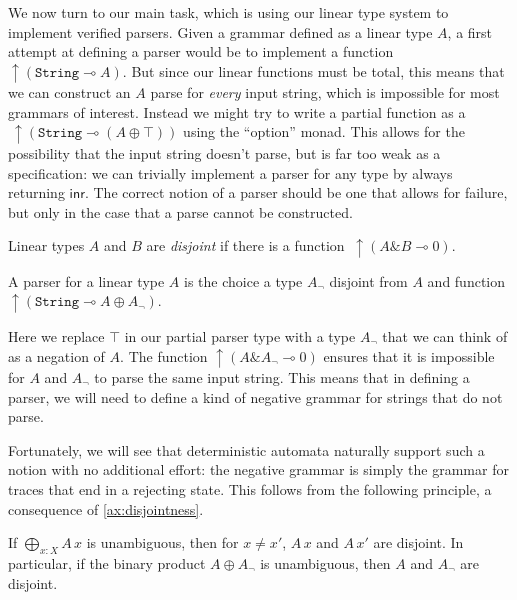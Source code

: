 \documentclass[acmsmall,nonacm]{acmart}
\newcommand{\inr}{\mathsf{inr}}
\newcommand{\lto}{\multimap}
\newcommand{\StringGram}{\texttt{String}}
\newcommand{\ltonl}[1]{~\uparrow #1}
\newcommand{\LinSigTy}[3]{\textstyle\bigoplus_{#1 : #2} #3}
\newcommand{\agdalogo}{%
  \usebox{\logoagdabox}}%
\newcommand{\zenodolink}{https://zenodo.org/records/15049780}
\newcommand{\Agda}{\href{\zenodolink}{\agdalogo}}
\begin{document}
We now turn to our main task, which is using our linear type system to
implement verified parsers. Given a grammar defined as a linear type
$A$, a first attempt at defining a parser would be to implement a
function $\uparrow{(\StringGram \lto A)}$. But since our linear functions
must be total, this means that we can construct an $A$ parse for
\emph{every} input string, which is impossible for most grammars of
interest. Instead we might try to write a partial function as a
$\ltonl{(\StringGram \lto (A \oplus \top))}$ using the ``option''
monad. This allows for the possibility that the input string doesn't
parse, but is far too weak as a specification: we can trivially
implement a parser for any type by always returning $\inr$. The
correct notion of a parser should be one that allows for failure, but
only in the case that a parse cannot be constructed.

\begin{definition}
  \label{def:disjoint}
  Linear types $A$ and $B$ are \emph{disjoint} if there is a function
  $\ltonl {\left( A \& B \lto 0 \right)}$.
\end{definition}

\begin{definition}
  \label{def:parser}
  A parser for a linear type $A$ is the choice a type $A_{\neg}$ disjoint from
  $A$ and function $\uparrow{(\StringGram \lto
    A \oplus A_{\neg})}$.
\end{definition}
Here we replace $\top$ in our partial parser type with a type
$A_{\neg}$ that we can think of as a negation of $A$. The function
$\uparrow{(A \& A_{\neg} \lto 0)}$ ensures that it is impossible for
$A$ and $A_{\neg}$ to parse the same input string. This means that in
defining a parser, we will need to define a kind of negative grammar
for strings that do not parse.

Fortunately, we will see that
deterministic automata naturally support such a notion with no
additional effort: the negative grammar is simply the grammar for
traces that end in a rejecting state. This follows from the following
principle, a consequence of \cref{ax:disjointness}.

\begin{lemma}[\Agda]
  \label{lem:unambig-to-disjoint}
  If $\LinSigTy{x}{X}{A\,x}$ is unambiguous, then for $x \neq x'$, $A\,x$ and $A\,x'$ are
  disjoint. In particular, if the binary product $A \oplus A_{\neg}$ is unambiguous, then
  $A$ and $A_{\neg}$ are disjoint.
\end{lemma}
\end{document}
